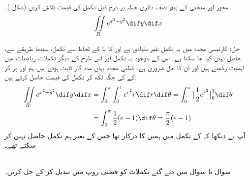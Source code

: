 محور  اور منحنی   کے بیچ نصف دائری خطہ  پر درج ذیل تکمل کی قیمت تلاش کریں (شکل )۔
\begin{align*}
\iint\limits_R e^{x^2+y^2}\dif y\dif x
\end{align*}

حل:\quad
کارتیسی محدد میں یہ تکمل غیر بنیادی ہے اور  کا  یا   کے لحاظ سے تکمل، سیدھا طریقے سے،   حاصل نہیں کیا جا سکتا ہے۔ اس کے باوجود یہ تکمل اور اس طرح کے دیگر تکملات ریاضیات میں اہمیت رکھتے ہیں اور ان کا حل ضروری ہے۔ قطبی محدد یہاں مدد گار ثابت ہوتے ہیں۔ہم  اور  پر کر کے  کی جگہ  لکھ کر تکمل کی قیمت حاصل کرتے ہیں:
\begin{align*}
\iint\limits_R e^{x^2+y^2}\dif y\dif x&=\int_0^{\pi}\int_0^1 e^{r^2}r\dif r\dif \theta=\int_0^{\pi}\big[\frac{1}{2}e^{r^2}\big]_0^1\dif\theta\\
&=\int_0^{\pi}\frac{1}{2}(e-1)\dif\theta=\frac{\pi}{2}(e-1)
\end{align*}
آپ نے دیکھا کہ     کے تکمل میں ہمیں    کا  درکار  تھا  جس کے بغیر ہم تکمل حاصل نہیں کر سکتے  تھے۔

\\
سوال  تا سوال   میں دیے گئے تکملات کو  قطبی روپ میں تبدیل کر کے حل کریں۔

